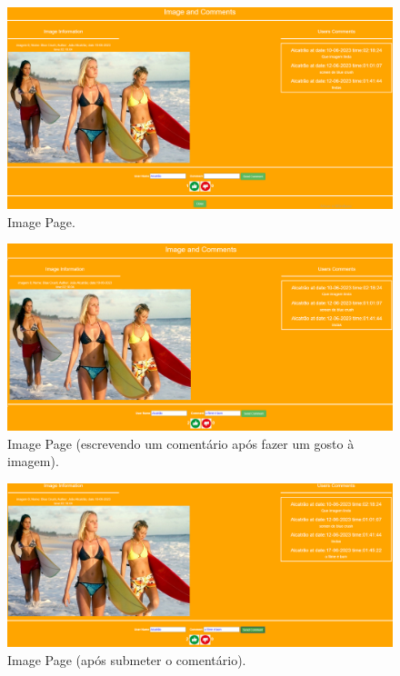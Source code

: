 \documentclass{report}
\begin{document}
    \begin{figure}[!hbtp]
        \centering 
        \includegraphics[scale=0.29]{Images_code/0 - imagem, comments, gostos.png}
        \caption{\label{Image}Image Page.}
    \end{figure}


    \begin{figure}[!hbtp]
        \centering 
        \includegraphics[scale=0.29]{Images_code/0 - imagem, comments, gostos 2.png}
        \caption{\label{Image}Image Page (escrevendo um comentário após fazer um gosto à imagem).}
    \end{figure}

    \begin{figure}[!hbtp]
        \centering 
        \includegraphics[scale=0.29]{Images_code/0 - imagem, comments, gostos 3.png}
        \caption{\label{Image}Image Page (após submeter o comentário).}
    \end{figure}
\end{document}
